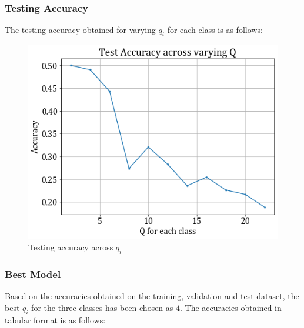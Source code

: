 \documentclass[11pt,a4paper]{article}
\begin{document}
\subsubsection{Testing Accuracy}
The testing accuracy obtained for varying $q_i$ for each class is as follows:
\begin{figure}[H]
    \centering
    \includegraphics[scale=0.5]{images/2A/2A_full_test_acc.png}
    \caption{Testing accuracy across $q_i$}
\end{figure}

\subsubsection{Best Model}
Based on the accuracies obtained on the training, validation and test dataset, the best $q_i$ for the three classes has been chosen as $4$. The accuracies obtained in tabular format is as follows:

\end{document}
